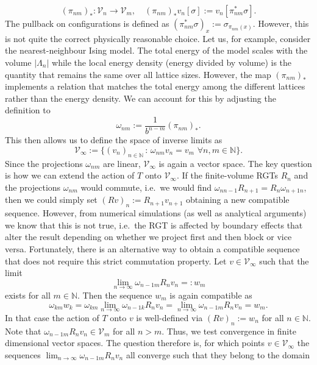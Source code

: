 \documentclass{article}
\begin{document}
\begin{equation}
    (\pi_{nm})_*:\mathcal{V}_n\to \mathcal{V}_m,\quad (\pi_{nm})_*v_n[\sigma]:=v_n[\pi_{nm}^*\sigma].
\end{equation}
The pullback on configurations is defined as $(\pi_{nm}^*\sigma)_x:=\sigma_{\pi_{nm}(x)}$. However, this is not quite the correct physically reasonable choice. Let us, for example, consider the nearest-neighbour Ising model. The total energy of the model scales with the volume $|\Lambda_n|$ while the local energy density (energy divided by volume) is the quantity that remains the same over all lattice sizes. However, the map $(\pi_{nm})_*$ implements a relation that matches the total energy among the different lattices rather than the energy density. We can account for this by adjusting the definition to
\begin{equation}
    \omega_{nm}:=\frac{1}{b^{n-m}}(\pi_{nm})_*.
\end{equation}
This then allows us to define the space of inverse limits as
\begin{equation}
    \mathcal{V}_\infty:=\{(v_n)_{n\in\mathds{N}}\,:\,\omega_{nm}v_n=v_m\,\,\forall n,m\in\mathds{N}\}.
\end{equation}
Since the projections $\omega_{nm}$ are linear, $\mathcal{V}_\infty$ is again a vector space. The key question is how we can extend the action of $T$ onto $\mathcal{V}_\infty$. If the finite-volume RGTs $R_n$ and the projections $\omega_{nm}$ would commute, i.e.\ we would find $\omega_{nn-1}R_{n+1}=R_n\omega_{n+1n}$, then we could simply set $(Rv)_n:=R_{n+1}v_{n+1}$ obtaining a new compatible sequence. However, from numerical simulations (as well as analytical arguments) we know that this is not true, i.e.\ the RGT is affected by boundary effects that alter the result depending on whether we project first and then block or vice versa. Fortunately, there is an alternative way to obtain a compatible sequence that does not require this strict commutation property. Let $v\in \mathcal{V}_\infty$ such that the limit
\begin{equation}
    \lim_{n\to\infty}\omega_{n-1m}R_nv_n=:w_m
\end{equation}
exists for all $m\in\mathds{N}$. Then the sequence $w_m$ is again compatible as
\begin{equation}
    \omega_{km}w_k=\omega_{km}\lim_{n\to\infty}\omega_{n-1k}R_nv_n=\lim_{n\to\infty}\omega_{n-1m}R_nv_n=w_m.
\end{equation}
In that case the action of $T$ onto $v$ is well-defined via $(Rv)_n:=w_n$ for all $n\in\mathds{N}$. Note that $\omega_{n-1m}R_nv_n\in\mathcal{V}_m$ for all $n>m$. Thus, we test convergence in finite dimensional vector spaces. The question therefore is, for which points $v\in \mathcal{V}_\infty$ the sequences $\lim_{n\to\infty}\omega_{n-1m}R_nv_n$ all converge such that they belong to the domain
\end{document}
